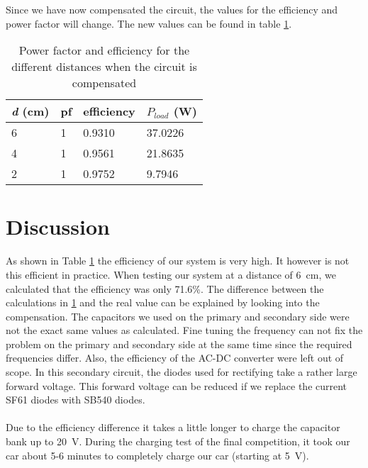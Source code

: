 \documentclass[final]{scrreprt} %
\begin{document}
Since we have now compensated the circuit, the values for the efficiency and power factor will change. 
The new values can be found in table \ref{table3}. \\

\begin{table}[h]
\begin{center}
\begin{tabular}{ l | l | l | l }
    
   \textit{d} (\si{\centi\metre})            & pf              & efficiency  &  $P_{load}$ (\si{\watt})\\	\hline
    6                           & 1                     & 0.9310                & 37.0226  \\
    4                           &1                  & 0.9561                     & 21.8635\\
    2                           & 1                   & 0.9752                    &  9.7946 \\
\end{tabular}
\caption{Power factor and efficiency for the different distances when the circuit is compensated}
\label{table3}
\end{center}
\end{table}


\section*{Discussion}

As shown in Table \ref{table3} the efficiency of our system is very high. 
It however is not this efficient in practice.
When testing our system at a distance of \SI{6}{\centi\metre}, we calculated that the efficiency was only 71.6\%.
The difference between the calculations in \ref{table3} and the real value can be explained by looking into the compensation. 
The capacitors we used on the primary and secondary side were not the exact same values as calculated.
Fine tuning the frequency can not fix the problem on the primary and secondary side at the same time since the required frequencies differ. 
Also, the efficiency of the AC-DC converter were left out of scope.
In this secondary circuit, the diodes used for rectifying take a rather large forward voltage.
This forward voltage can be reduced if we replace the current SF61 diodes with SB540 diodes.
\\ \\
Due to the efficiency difference it takes a little longer to charge the capacitor bank up to \SI{20}{\volt}.
During the charging test of the final competition, it took our car about 5-6 minutes to completely charge our car (starting at \SI{5}{\volt}). %
\end{document}
